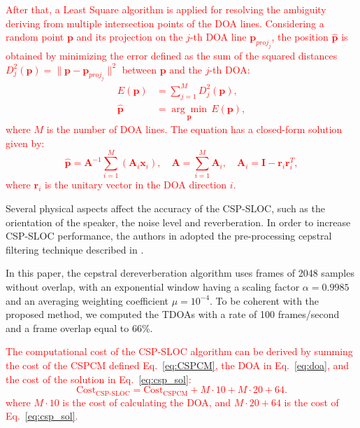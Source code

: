 \documentclass[review]{elsarticle}
\let\originaleqref=\eqref
\renewcommand{\eqref}{Eq.~\originaleqref}
\begin{document}
\textcolor{red}{After that, a Least Square algorithm is applied for resolving the ambiguity deriving from multiple intersection points of the DOA lines.  Considering a random point $\mathbf{p}$ and its projection on the $j$-th DOA line $\mathbf{p}_{proj_j}$, the position $\hat{\mathbf{p}}$ is obtained by minimizing the error defined as the sum of the squared distances $D^2_j(\mathbf{p}) = \|\mathbf{p}-\mathbf{p}_{proj_j}\|^2$ between $\mathbf{p}$ and the $j$-th DOA:
\begin{align}
E(\mathbf{p}) &= \sum_{j=1}^M D^2_j (\mathbf{p}),\\
\hat{\mathbf{p}} & =  \underset{\mathbf{p}} {\arg \min} \,E(\mathbf{p}), \label{eq:ls}
\end{align}
where $M$ is the number of DOA lines. The equation has a closed-form solution given by:
\begin{equation}\label{eq:csp_sol}
\hat{\mathbf{p}} = \mathbf{A}^{-1} \sum_{i=1}^M (\mathbf{A}_i\mathbf{x}_i), \quad \mathbf{A} = \sum_{i=1}^M\mathbf{A}_i, \quad \mathbf{A}_i=\mathbf{I}-\mathbf{r}_i \mathbf{r}_i^T,
\end{equation}
where $\mathbf{r}_i$ is the unitary vector in the DOA direction $i$.}

Several physical aspects affect the accuracy of the CSP-SLOC, such as the orientation of the speaker, the noise level and reverberation. In order to increase CSP-SLOC performance, the authors in \cite{tsiami2014experiments} adopted the pre-processing cepstral filtering technique described in \cite{stephenne1997new}. 

In this paper, the cepstral dereverberation algorithm uses frames of 2048 samples without overlap, with an exponential window having a scaling factor $\alpha = 0.9985$ and an averaging weighting coefficient $\mu=10^{-4}$. To be coherent with the proposed method, we computed the TDOAs with a rate of 100 frames/second and a frame overlap equal to 66\%.

\textcolor{red}{The computational cost of the CSP-SLOC algorithm can be derived by summing the cost of the CSPCM defined \eqref{eq:CSPCM}, the DOA in \eqref{eq:doa}, and the cost of the solution in \eqref{eq:csp_sol}:
\begin{equation}\label{eq:cost_csp}
\text{Cost}_{\text{CSP-SLOC}}= \text{Cost}_{\text{CSPCM}} + M\cdot10 + M\cdot20 + 64.
\end{equation}
where $M\cdot10$ is the cost of calculating the DOA, and  $M\cdot20 + 64$ is the cost of \eqref{eq:csp_sol}.
}
\end{document}
